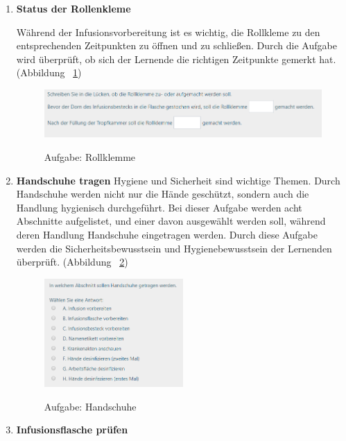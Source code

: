\begin{enumerate}
    \item \textbf{Status der Rollenkleme}
    
    Während der Infusionsvorbereitung ist es wichtig, die Rollkleme zu den entsprechenden Zeitpunkten zu öffnen und zu schließen. Durch die Aufgabe wird überprüft, ob sich der Lernende die richtigen Zeitpunkte gemerkt hat. (Abbildung ~\ref{fig:Aufgabe3})
    
\begin{figure}[ht]
\vspace*{1em}
\centering
\caption{Aufgabe: Rollklemme}
\includegraphics[width= \textwidth]{images/Aufgabe3.png}
\label{fig:Aufgabe3} 
\end{figure}
    
    \item \textbf{Handschuhe tragen}
    Hygiene und Sicherheit sind wichtige Themen. Durch Handschuhe werden nicht nur die Hände geschützt, sondern auch die Handlung hygienisch durchgeführt. Bei dieser Aufgabe werden acht Abschnitte aufgelistet, und einer davon ausgewählt werden soll, während deren Handlung Handschuhe eingetragen werden. Durch diese Aufgabe werden die Sicherheitsbewusstsein und Hygienebewusstsein der Lernenden überprüft. (Abbildung ~\ref{fig:Aufgabe4})
    
\begin{figure}[ht]
\vspace*{1em}
\centering
\caption{Aufgabe: Handschuhe}
\includegraphics[width= 0.5\textwidth]{images/Aufgabe4.png}
\label{fig:Aufgabe4} 
\end{figure}
    
    \item \textbf{Infusionsflasche prüfen}
    

\end{enumerate}
